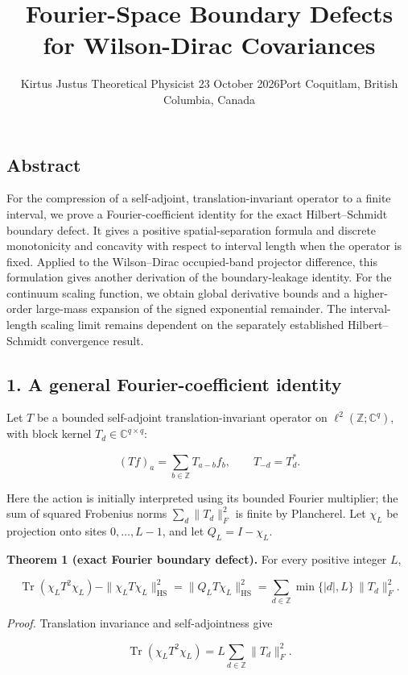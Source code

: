 \documentclass[
  10pt,
  a4paper,
]{article}
\title{Fourier-Space Boundary Defects for Wilson-Dirac Covariances}
\author{Kirtus Justus \textbullet{} Theoretical Physicist \textbullet{} 23 October 2026\tabularnewline Port Coquitlam, British Columbia, Canada}
\date{}
\begin{document}
\maketitle

\subsection{Abstract}\label{abstract}

For the compression of a self-adjoint, translation-invariant operator to a finite interval, we prove a Fourier-coefficient identity for the exact Hilbert--Schmidt boundary defect. It gives a positive spatial-separation formula and discrete monotonicity and concavity with respect to interval length when the operator is fixed. Applied to the Wilson--Dirac occupied-band projector difference, this formulation gives another derivation of the boundary-leakage identity. For the continuum scaling function, we obtain global derivative bounds and a higher-order large-mass expansion of the signed exponential remainder. The interval-length scaling limit remains dependent on the separately established Hilbert--Schmidt convergence result.

\subsection{1. A general Fourier-coefficient identity}\label{a-general-fourier-coefficient-identity}

Let \(T\) be a bounded self-adjoint translation-invariant operator on \(\ell^2(\mathbb Z;\mathbb C^q)\), with block kernel \(T_d\in\mathbb C^{q\times q}\):

\[
(Tf)_a=\sum_{b\in\mathbb Z}T_{a-b}f_b,\qquad T_{-d}=T_d^*.
\]

Here the action is initially interpreted using its bounded Fourier multiplier; the sum of squared Frobenius norms \(\sum_d\|T_d\|_F^2\) is finite by Plancherel. Let \(\chi_L\) be projection onto sites \(0,\ldots,L-1\), and let \(Q_L=I-\chi_L\).

\textbf{Theorem 1 (exact Fourier boundary defect).} For every positive integer \(L\),

\[
\boxed{\operatorname{Tr}(\chi_LT^2\chi_L)-\|\chi_LT\chi_L\|_{\mathrm{HS}}^2
=\|Q_LT\chi_L\|_{\mathrm{HS}}^2
=\sum_{d\in\mathbb Z}\min\{|d|,L\}\,\|T_d\|_F^2.}
\tag{1}
\]

\emph{Proof.} Translation invariance and self-adjointness give

\[
\operatorname{Tr}(\chi_LT^2\chi_L)=L\sum_{d\in\mathbb Z}\|T_d\|_F^2.
\]
\end{document}
